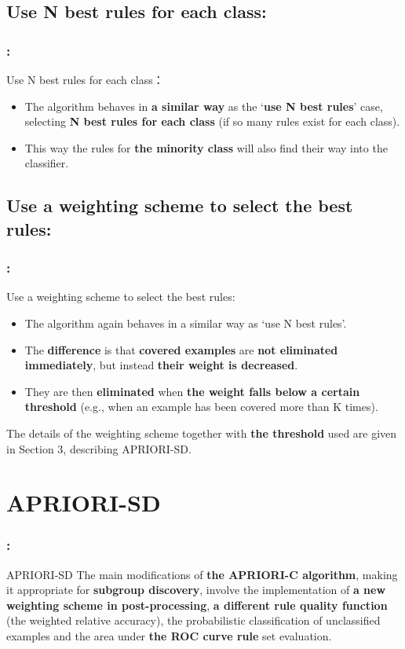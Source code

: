 \documentclass{beamer}
\begin{document}
\begin{CJK*}{UTF8}{bsmi}
\subsection{Use N best rules for each class:}
\begin{frame}
	\frametitle{\insertsection : \insertsubsection}
	\begin{block}{Use N best rules for each class：}
		\begin{itemize}
			\item  The algorithm behaves in \textbf{a similar way} as the ‘\textbf{use N best rules}’ case, selecting \textbf{N best rules for each class} (if so many rules exist for each class).
			\item This way the rules for\textbf{ the minority class }will also find their way into the classifier.
		\end{itemize}
	\end{block}
\end{frame}
\subsection{Use a weighting scheme to select the best rules:}
\begin{frame}
	\frametitle{\insertsection : \insertsubsection}
	\begin{block}{Use a weighting scheme to select the best rules:}
		\begin{itemize}
			\item  The algorithm again behaves in a similar way as ‘use N best rules’.
			\item The \textbf{difference} is that \textbf{covered examples} are \textbf{not eliminated immediately}, but instead \textbf{their weight is decreased}.
			\item They are then \textbf{eliminated} when \textbf{the weight falls below a certain threshold} (e.g., when an example has been covered more than K times).
		\end{itemize}
	\end{block}
	The details of the weighting scheme together with \textbf{the threshold }used are given in Section 3, describing APRIORI-SD.
\end{frame}
\section{APRIORI-SD} 
\begin{frame}
	\frametitle{\insertsection : \insertsubsection}
	\begin{block}{APRIORI-SD}
		The main modifications of \textbf{the APRIORI-C algorithm}, making it appropriate for \textbf{subgroup discovery}, involve the implementation of \textbf{a new weighting scheme in post-processing}, \textbf{a different rule quality function} (the weighted relative accuracy), the probabilistic classification of unclassified examples and the area under \textbf{the ROC curve rule} set evaluation.
	\end{block}
\end{frame}

\end{CJK*}
\end{document}
